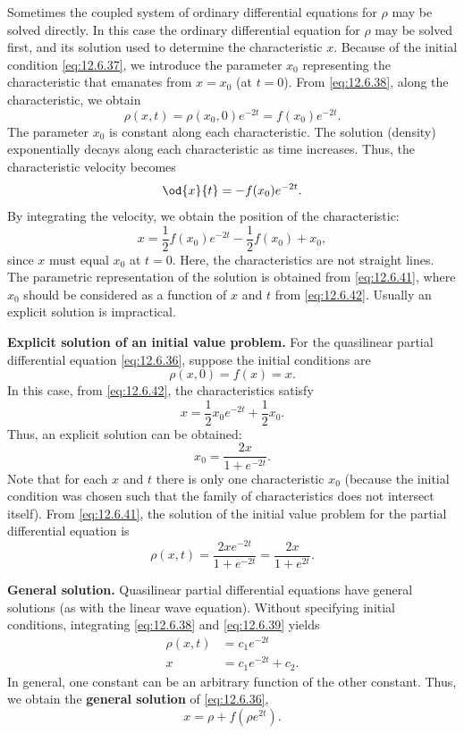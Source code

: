 Sometimes the coupled system of ordinary differential equations for $\rho$ may be solved directly.  In this case the ordinary differential equation for $\rho$ may be solved first, and its solution used to determine the characteristic $x$.  Because of the initial condition \eqref{eq:12.6.37}, we introduce the parameter $x_0$ representing the characteristic that emanates from $x = x_0$ (at $t = 0$).  From \eqref{eq:12.6.38}, along the characteristic, we obtain
\begin{equation}
\label{eq:12.6.41}
\rho(x,t) = \rho(x_0,0)e^{-2t} = f(x_0)e^{-2t}.
\end{equation}
The parameter $x_0$ is constant along each characteristic.  The solution (density) exponentially decays along each characteristic as time increases.  Thus, the characteristic velocity becomes
\[
\od{x}{t} = -f(x_0)e^{-2t}.
\]
By integrating the velocity, we obtain the position of the characteristic:
\begin{equation}
\label{eq:12.6.42}
x = \frac{1}{2}f(x_0)e^{-2t} - \frac{1}{2}f(x_0) + x_0,
\end{equation}
since $x$ must equal $x_0$ at $t = 0$.  Here, the characteristics are not straight lines.  The parametric representation of the solution is obtained from \eqref{eq:12.6.41}, where $x_0$ should be considered as a function of $x$ and $t$ from \eqref{eq:12.6.42}.  Usually an explicit solution is impractical.

\textbf{Explicit solution of an initial value problem.}  For the quasilinear partial differential equation \eqref{eq:12.6.36}, suppose the initial conditions are
\[
\rho(x,0) = f(x) = x.
\]
In this case, from \eqref{eq:12.6.42}, the characteristics satisfy
\[
x = \frac{1}{2}x_0 e^{-2t} + \frac{1}{2}x_0.
\]
Thus, an explicit solution can be obtained:
\[
x_0 = \frac{2x}{1 + e^{-2t}}.
\]
Note that for each $x$ and $t$ there is only one characteristic $x_0$ (because the initial condition was chosen such that the family of characteristics does not intersect itself).  From \eqref{eq:12.6.41}, the solution of the initial value problem for the partial differential equation is
\[
\rho(x,t) = \frac{2xe^{-2t}}{1 + e^{-2t}} = \frac{2x}{1 + e^{2t}}.
\]

\textbf{General solution.}  Quasilinear partial differential equations have general solutions (as with the linear wave equation).  Without specifying initial conditions, integrating \eqref{eq:12.6.38} and \eqref{eq:12.6.39} yields
\begin{align*}
\rho(x,t) &= c_1 e^{-2t} \\
x &= c_1 e^{-2t} + c_2.
\end{align*}
In general, one constant can be an arbitrary function of the other constant.  Thus, we obtain the \textbf{general solution} of \eqref{eq:12.6.36},
\[
x = \rho + f(\rho e^{2t}).
\]

